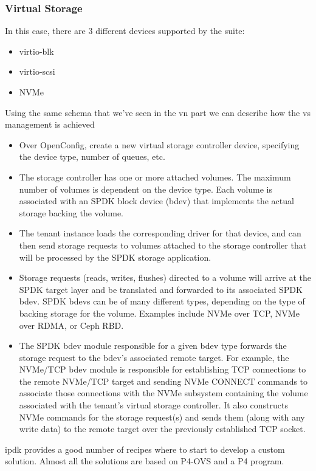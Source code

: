 \documentclass[../sn.tex]{subfiles}
\begin{document}
\subsubsection{Virtual Storage}
In this case, there are 3 different devices supported by the suite:
\begin{itemize}
    \item virtio-blk
    \item virtio-scsi
    \item NVMe
\end{itemize}
Using the same schema that we've seen in the \acrshort{vn} part we can describe how the \acrlong{vs} management is achieved
\begin{itemize}
    \item {} Over OpenConfig, create a new virtual storage controller device, specifying the device type, number of queues, etc.
    \item {} The storage controller has one or more attached volumes.
    The maximum number of volumes is dependent on the device type.
    Each volume is associated with an SPDK block device (bdev) that implements the actual storage backing the volume.
    \item {} The tenant instance loads the corresponding driver for that device, and can then send storage requests to volumes attached to the storage controller that will be processed by the SPDK storage application.
    \item {} Storage requests (reads, writes, flushes) directed to a volume will arrive at the SPDK target layer and be translated and forwarded to its associated SPDK bdev.
    SPDK bdevs can be of many different types, depending on the type of backing storage for the volume.
    Examples include NVMe over TCP, NVMe over RDMA, or Ceph RBD.
    \item {} The SPDK bdev module responsible for a given bdev type forwards the storage request to the bdev's associated remote target.
    For example, the NVMe/TCP bdev module is responsible for establishing TCP connections to the remote NVMe/TCP target and sending NVMe CONNECT commands to associate those connections with the NVMe subsystem containing the volume associated with the tenant's virtual storage controller.
    It also constructs NVMe commands for the storage request(s) and sends them (along with any write data) to the remote target over the previously established TCP socket.
\end{itemize}
\acrshort{ipdk} provides a good number of recipes where to start to develop a custom solution.
Almost all the solutions are based on P4-OVS and a P4 program.
\end{document}
